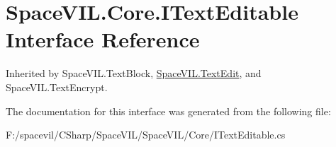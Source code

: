 \hypertarget{interface_space_v_i_l_1_1_core_1_1_i_text_editable}{}\section{Space\+V\+I\+L.\+Core.\+I\+Text\+Editable Interface Reference}
\label{interface_space_v_i_l_1_1_core_1_1_i_text_editable}


Inherited by Space\+V\+I\+L.\+Text\+Block, \mbox{\hyperlink{class_space_v_i_l_1_1_text_edit}{Space\+V\+I\+L.\+Text\+Edit}}, and Space\+V\+I\+L.\+Text\+Encrypt.



The documentation for this interface was generated from the following file\+:\begin{DoxyCompactItemize}
\item 
F\+:/spacevil/\+C\+Sharp/\+Space\+V\+I\+L/\+Space\+V\+I\+L/\+Core/I\+Text\+Editable.\+cs\end{DoxyCompactItemize}
